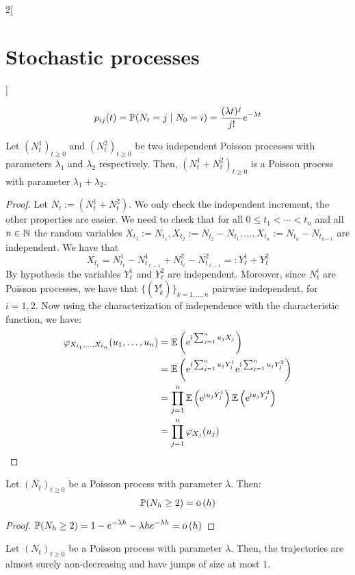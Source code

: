 \documentclass[../../../main_math.tex]{subfiles}
\begin{document}
\begin{multicols}{2}[\section{Stochastic processes}]
\begin{corollary}
    $$
      p_{ij}(t)=\mathbb{P}(N_t=j\mid N_0=i)=\frac{(\lambda t)^j}{j!}e^{-\lambda t}
    $$
  \end{corollary}
  \begin{proposition}
    Let ${(N_t^1)}_{t\geq 0}$ and ${(N_t^2)}_{t\geq 0}$ be two independent Poisson processes with parameters $\lambda_1$ and $\lambda_2$ respectively. Then, ${(N_t^1+N_t^2)}_{t\geq 0}$ is a Poisson process with parameter $\lambda_1+\lambda_2$.
  \end{proposition}
  \begin{proof}
    Let $N_t:=(N_t^1+N_t^2)$. We only check the independent increment, the other properties are easier. We need to check that for all $0\leq t_1< \cdots < t_n$ and all $n\in\mathbb{N}$ the random variables $X_{t_1}:=N_{t_1},X_{t_2}:= N_{t_2}-N_{t_1},\ldots,X_{t_n}:=N_{t_n}-N_{t_{n-1}}$ are independent. We have that
    $$
      X_{t_\ell}=N_{t_\ell}^1-N_{t_{\ell-1}}^1+N_{t_\ell}^2-N_{t_{\ell-1}}^2=:Y_\ell^1+Y_\ell^2
    $$
    By hypothesis the variables $Y_\ell^1$ and $Y_\ell^2$ are independent. Moreover, since $N_t^i$ are Poisson processes, we have that $\{(Y_k^i)\}_{k=1,\ldots,n}$ pairwise independent, for $i=1,2$. Now using the characterization of independence with the characteristic function, we have:
    \begin{align*}
      \varphi_{X_{t_1},\ldots,X_{t_n}}(u_1,\ldots,u_n) & =\mathbb{E}\left(\mathrm{e}^{\mathrm{i}\sum_{j=1}^nu_j X_j}\right)                                       \\
                                                       & =\mathbb{E}\left(\mathrm{e}^{\mathrm{i}\sum_{j=1}^nu_jY_j^1}\mathrm{e}^{\mathrm{i}\sum_{j=1}^nu_jY_j^2}\right)         \\
                                                       & =\prod_{j=1}^n\mathbb{E}\left(\mathrm{e}^{\mathrm{i} u_jY_j^1}\right)\mathbb{E}\left(\mathrm{e}^{\mathrm{i} u_jY_j^2}\right) \\
                                                       & = \prod_{j=1}^n\varphi_{X_j}(u_j)
    \end{align*}
  \end{proof}
  \begin{lemma}
    Let ${(N_t)}_{t\geq 0}$ be a Poisson process with parameter $\lambda$. Then: $$\mathbb{P}(N_h\geq 2)=\mathrm{o}\left(h\right)$$
  \end{lemma}
  \begin{proof}
    $\displaystyle
      \mathbb{P}(N_h\geq 2)=1-e^{-\lambda h}-\lambda h e^{-\lambda h}=\mathrm{o}\left(h\right)$
  \end{proof}
  \begin{proposition}
    Let ${(N_t)}_{t\geq 0}$ be a Poisson process with parameter $\lambda$. Then, the trajectories are almost surely non-decreasing and have jumps of size at most $1$.

\end{proposition}
\end{multicols}
\end{document}
